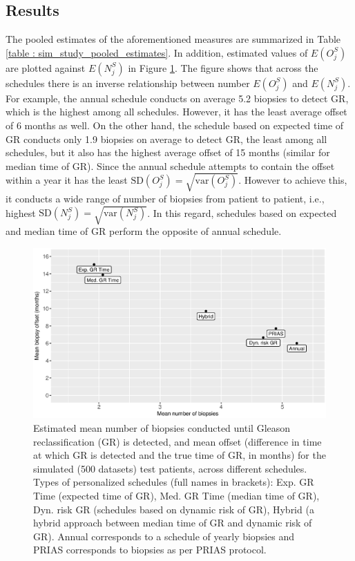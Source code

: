 \subsection{Results}
The pooled estimates of the aforementioned measures are summarized in Table \ref{table : sim_study_pooled_estimates}. In addition, estimated values of $E(O^S_j)$ are plotted against $E(N^S_j)$ in Figure \ref{fig : meanNbVsOffset}. The figure shows that across the schedules there is an inverse relationship between number $E(O^S_j)$ and $E(N^S_j)$. For example, the annual schedule conducts on average 5.2 biopsies to detect GR, which is the highest among all schedules. However, it has the least average offset of 6 months as well. On the other hand, the schedule based on expected time of GR conducts only 1.9 biopsies on average to detect GR, the least among all schedules, but it also has the highest average offset of 15 months (similar for median time of GR). Since the annual schedule attempts to contain the offset within a year it has the least $\mbox{SD}(O^S_j) = \sqrt{\mbox{var}(O^S_j)}$. However to achieve this, it conducts a wide range of number of biopsies from patient to patient, i.e., highest $\mbox{SD}(N^S_j) = \sqrt{\mbox{var}(N^S_j)}$. In this regard, schedules based on expected and median time of GR perform the opposite of annual schedule.

\begin{figure}
\centerline{\includegraphics[width=\columnwidth]{images/sim_study/meanNbVsOffset_all.eps}}
\caption{Estimated mean number of biopsies conducted until Gleason reclassification (GR) is detected, and mean offset (difference in time at which GR is detected and the true time of GR, in months) for the simulated (500 datasets) test patients, across different schedules. Types of personalized schedules (full names in brackets): Exp. GR Time (expected time of GR), Med. GR Time (median time of GR), Dyn. risk GR (schedules based on dynamic risk of GR), Hybrid (a hybrid approach between median time of GR and dynamic risk of GR). Annual corresponds to a schedule of yearly biopsies and PRIAS corresponds to biopsies as per PRIAS protocol.}
\label{fig : meanNbVsOffset}
\end{figure}

